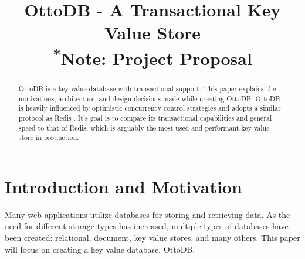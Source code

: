 \documentclass[conference]{IEEEtran}
\begin{document}
    
    \title{OttoDB - A Transactional Key Value Store\\
    {\footnotesize \textsuperscript{*}Note: Project Proposal}
    }
    
    \author{
    }
    
    \maketitle
    

    \begin{abstract}
        OttoDB is a key value database with transactional support. This paper explains the motivations, architecture, and design decisions made while creating OttoDB. OttoDB is heavily influenced by optimistic concurrency control strategies and adopts a similar protocol as Redis \cite{b1}. It’s goal is to compare its transactional capabilities and general speed to that of Redis, which is arguably the most used and performant key-value store in production.
    \end{abstract}
    

    \section{Introduction and Motivation}
    Many web applications utilize databases for storing and retrieving data. As the need for different storage types has increased, multiple types of databases have been created: relational, document, key value stores, and many others. This paper will focus on creating a key value database, OttoDB.
    
\end{document}
